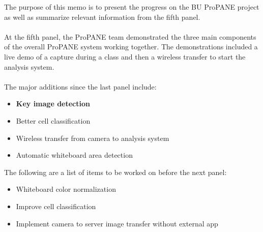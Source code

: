 \documentclass{texMemo}
\begin{document}
\maketitle
\noindent
The purpose of this memo is to present the progress on the BU ProPANE project as well as summarize relevant information from the fifth panel. \\
\\
At the fifth panel, the ProPANE team demonstrated the three main components of the overall ProPANE system working together. The demonstrations included a live demo of a capture during a class and then a wireless transfer to start the analysis system.\\
\\
The major additions since the last panel include:
\begin{itemize}
	\item \textbf{Key image detection}
	\item Better cell classification
	\item Wireless transfer from camera to analysis system
	\item Automatic whiteboard area detection
\end{itemize}

\noindent
The following are a list of items to be worked on before the next panel:
\begin{itemize}
	\item Whiteboard color normalization
	\item Improve cell classification
	\item Implement camera to server image transfer without external app
\end{itemize}
\end{document}
